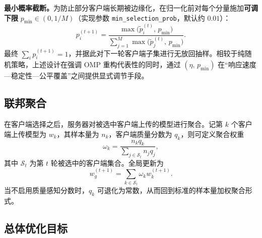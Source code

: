 \documentclass{article}
\begin{document}
\textbf{最小概率截断。}为防止部分客户端长期被边缘化，在归一化前对每个分量施加\textbf{可调下限} $p_{\min}\in(0,1/M)$（实现参数 \texttt{min\_selection\_prob}，默认约 $0.01$）：
\begin{equation}
p_i^{(t+1)}=\frac{\max\bigl(\tilde{p}_i^{(t)},\,p_{\min}\bigr)}{\sum_{j=1}^{M}\max\bigl(\tilde{p}_j^{(t)},\,p_{\min}\bigr)}.
\end{equation}
最终 $\sum_i p_i^{(t+1)}=1$，并据此对下一轮客户端子集进行无放回抽样。相较于纯随机策略，上述设计在强调 OMP 重构代表性的同时，通过 $(\eta,\,p_{\min})$ 在“响应速度—稳定性—公平覆盖”之间提供显式调节手段。

\subsection{联邦聚合}

在客户端选择之后，服务器对被选中客户端上传的模型进行聚合。记第 $k$ 个客户端上传模型为 $w_k$，其样本量为 $n_k$，客户端质量分数为 $q_k$，则可定义聚合权重
\begin{equation}
\omega_k = \frac{n_k q_k}{\sum_{j\in \mathcal{S}_t} n_j q_j},
\end{equation}
其中 $\mathcal{S}_t$ 为第 $t$ 轮被选中的客户端集合。全局更新为
\begin{equation}
w_g^{(t+1)} = \sum_{k\in \mathcal{S}_t} \omega_k w_k^{(t+1)}.
\end{equation}
当不启用质量感知分数时，$q_k$ 可退化为常数，从而回到标准的样本量加权聚合形式。

\subsection{总体优化目标}
\end{document}
